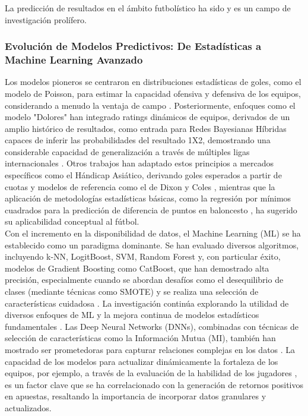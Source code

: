 La predicción de resultados en el ámbito futbolístico ha sido y es un campo de investigación prolífero.

\subsubsection{Evolución de Modelos Predictivos: De Estadísticas a Machine Learning Avanzado}

Los modelos pioneros se centraron en distribuciones estadísticas de goles, como el modelo de Poisson, para estimar la capacidad ofensiva y defensiva de los equipos, considerando a menudo la ventaja de campo \cite{Fontanella2020Visual}.
Posteriormente, enfoques como el modelo "Dolores" han integrado ratings dinámicos de equipos, derivados de un amplio histórico de resultados, como entrada para Redes Bayesianas Híbridas capaces de inferir las probabilidades del resultado 1X2, demostrando una considerable capacidad de generalización a través de múltiples ligas internacionales \cite{Constantinou2019Dolores}.
Otros trabajos han adaptado estos principios a mercados específicos como el Hándicap Asiático, derivando goles esperados a partir de cuotas y modelos de referencia como el de Dixon y Coles \cite{Chen2019Cluster},
mientras que la aplicación de metodologías estadísticas básicas, como la regresión por mínimos cuadrados para la predicción de diferencia de puntos en baloncesto \cite{Lu2019NBAPointDiff}, ha sugerido su aplicabilidad conceptual al fútbol. \\

Con el incremento en la disponibilidad de datos, el Machine Learning (ML) se ha establecido como un paradigma dominante.
Se han evaluado diversos algoritmos, incluyendo k-NN, LogitBoost, SVM, Random Forest y, con particular éxito, modelos de Gradient Boosting como CatBoost, que han demostrado alta precisión, especialmente cuando se abordan desafíos como el desequilibrio de clases (mediante técnicas como SMOTE) y se realiza una selección de características cuidadosa \cite{Malamatinos2022GreekLeague}.
La investigación continúa explorando la utilidad de diversos enfoques de ML \cite{Jaeyalakshmi2023PredictingOutcomeML} y la mejora continua de modelos estadísticos fundamentales \cite{Loukas2024PoissonRegression}.
Las Deep Neural Networks (DNNs), combinadas con técnicas de selección de características como la Información Mutua (MI), también han mostrado ser prometedoras para capturar relaciones complejas en los datos \cite{Tammouch2024BettingML}.
La capacidad de los modelos para actualizar dinámicamente la fortaleza de los equipos, por ejemplo, a través de la evaluación de la habilidad de los jugadores \cite{holmesForecastingFootballMatch2024}, es un factor clave que se ha correlacionado con la generación de retornos positivos en apuestas, resaltando la importancia de incorporar datos granulares y actualizados. \\

